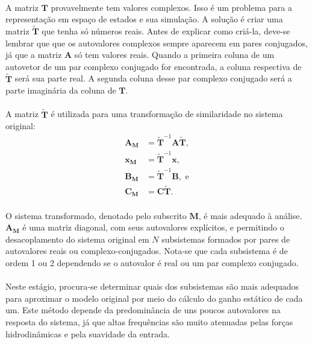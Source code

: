 \paragraph{} A matriz $\mathbf{T}$ provavelmente tem valores complexos. Isso é um problema para a representação em espaço de estados e sua simulação. A solução é criar uma matriz $\mathbf{\tilde{T}}$ que tenha só números reais. Antes de explicar como criá-la, deve-se lembrar que que os autovalores complexos sempre aparecem em pares conjugados, já que a matriz $\mathbf{A}$ só tem valores reais. Quando a primeira coluna de um autovetor de um par complexo conjugado for encontrada, a coluna respectiva de $\mathbf{\tilde{T}}$ será sua parte real. A segunda coluna desse par complexo conjugado será a parte imaginária da coluna de $\mathbf{T}$.


\paragraph{} A matriz $\mathbf{\tilde{T}}$ é utilizada para uma transformação de similaridade no sistema original: \begin{align}
	\mathbf{A_M} &= \mathbf{\tilde{T}}^{-1}\mathbf{A}\mathbf{\tilde{T}},\\
	\mathbf{x_M} &=\mathbf{\tilde{T}}^{-1}\mathbf{x},	\\
	\mathbf{B_M} &= \mathbf{\tilde{T}}^{-1}\mathbf{B},\textrm{ e}\\
	\mathbf{C_M} &=\mathbf{C}\mathbf{\tilde{T}}.
\end{align}


\paragraph{} O sistema transformado, denotado pelo subscrito $\mathbf{M}$, é mais adequado à análise. $\mathbf{A_M}$ é uma matriz diagonal, com seus autovalores explícitos, e permitindo o desacoplamento do sistema original em $N$ subsistemas formados por pares de autovalores reais ou complexo-conjugados. Nota-se que cada subsistema é de ordem 1 ou 2 dependendo se o autovalor é real ou um par complexo conjugado.

\paragraph{} Neste estágio, procura-se determinar quais dos subsistemas são mais adequados para aproximar o modelo original por meio do cálculo do ganho estático de cada um. Este método depende da predominância de uns poucos autovalores na resposta do sistema, já que altas frequências são muito atenuadas pelas forças hidrodinâmicas e pela suavidade da entrada.

